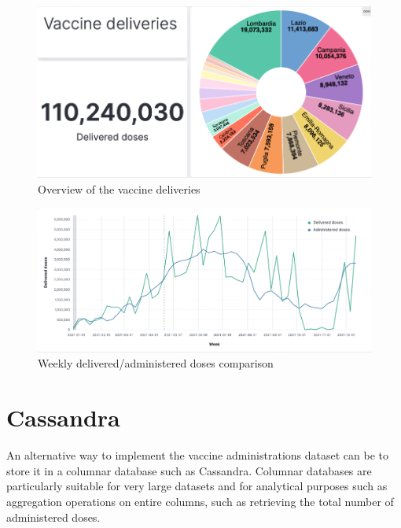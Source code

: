 \documentclass{article}
\begin{document}
    \begin{figure}
        \centering
        \includegraphics[scale=0.3]{ir databases/screenshots/del_overview.png}
        \caption{Overview of the vaccine deliveries}
        \label{fig:del_overview}
    \end{figure}
    \begin{figure}
        \centering
        \includegraphics[scale=0.3]{ir databases/screenshots/del_weekly.png}
        \caption{Weekly delivered/administered doses comparison}
        \label{fig:del_weekly}
    \end{figure}

\section{Cassandra}
An alternative way to implement the vaccine administrations dataset can be to store it in a columnar database such as Cassandra. Columnar databases are particularly suitable for very large datasets and for analytical purposes such as aggregation operations on entire columns, such as retrieving the total number of administered doses. 
\end{document}
